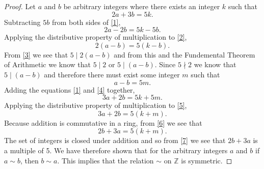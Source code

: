 \documentclass[12pt]{article}
\begin{document}
\begin{proof}
Let $a$ and $b$ be arbitrary integers where there exists an integer $k$ such that
\begin{equation}\label{1}
2a + 3b = 5k.
\end{equation}
Subtracting $5b$ from both sides of \eqref{1},
\begin{equation}\label{2}
2a - 2b = 5k - 5b.
\end{equation}
Applying the distributive property of multiplication to \eqref{2},
\begin{equation}\label{3}
2(a-b) = 5(k-b).
\end{equation}
From \eqref{3} we see that $5\mid 2(a-b)$ and from this and the Fundemental Theorem of Arithmetic we know that $5\mid 2$ or $5\mid (a-b)$. Since $5 \nmid 2$ we know that $5\mid (a-b)$ and therefore there must exist some integer $m$ such that
\begin{equation}\label{4}
a-b=5m.
\end{equation}
Adding the equations \eqref{1} and \eqref{4} together,
\begin{equation}\label{5}
3a + 2b = 5k + 5m.
\end{equation}
Applying the distributive property of multiplication to \eqref{5},
\begin{equation}\label{6}
3a + 2b = 5(k+m).
\end{equation}
Because addition is commutative in a ring, from \eqref{6} we see that
\begin{equation}\label{7}
2b + 3a = 5(k+m).
\end{equation}
The set of integers is closed under addition and so from \eqref{7} we see that $2b+3a$ is a multiple of 5. We have therefore shown that for the arbitrary integers $a$ and $b$ if $a\sim b$, then $b \sim a$. This implies that the relation $\sim$ on $\mathbb{Z}$ is symmetric.
\end{proof}
\end{document}
